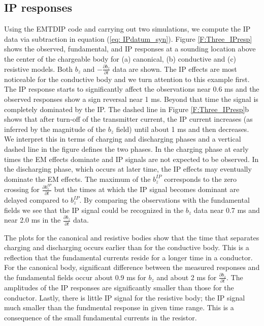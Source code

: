\documentclass[a4paper, 11pt]{article}
\begin{document}
\subsection{IP responses}
Using the  EMTDIP code and carrying out two simulations, we compute the IP data via subtraction in equation (\ref{eq: IPdatum_syn}).
Figure \ref{F:Three_IPresp} shows the observed, fundamental, and IP responses at a sounding location above the center of the chargeable body for (a) canonical, (b) conductive and (c) resistive models. Both $b_z$ and $-\frac{\partial b_z}{\partial t}$ data are shown. 
The IP effects are most noticeable for the conductive body and we turn attention to this example first. The IP response starts to significantly affect the observations near 0.6 ms and the observed responses show a sign reversal near 1 ms. Beyond that time the signal is completely dominated by the IP. The dashed line in Figure \ref{F:Three_IPresp}b shows that after turn-off of the transmitter current, the IP current increases (as inferred by the magnitude of the $b_z$ field) until about 1 ms and then decreases. We interpret this in terms of charging and discharging phases and a vertical dashed line in the figure defines the two phases. In the charging phase at early times the EM effects dominate and IP signals are not expected to be observed. In the discharging phase, which occurs at  later time, the IP effects may eventually dominate the EM effects. The maximum of the $b_z^{IP}$ corresponds to the zero crossing for $\frac{\partial b_z^{IP}}{\partial t}$ but the times at which the IP signal becomes dominant are delayed compared to $b_z^{IP}$. By comparing the observations with the fundamental fields we see that the IP signal could be recognized in the $b_z$ data near 0.7 ms and near 2.0 ms in the $\frac{\partial b_z}{\partial t}$ data.

The plots for the canonical and resistive bodies show that the time that separates charging and discharging occurs earlier than for the conductive body. This is a reflection that the fundamental currents reside for a longer time in a conductor. For the canonical body, significant difference between the measured responses and the fundamental fields occur about 0.9 ms for $b_z$ and about 2 ms for $\frac{\partial b_z}{\partial t}$. The amplitudes of the IP responses are significantly smaller than those for the conductor.  Lastly, there is little IP signal for the resistive body; the IP signal much smaller than the fundmental response in given time range. This is a consequence of the small fundamental currents in the resistor. 
\end{document}
